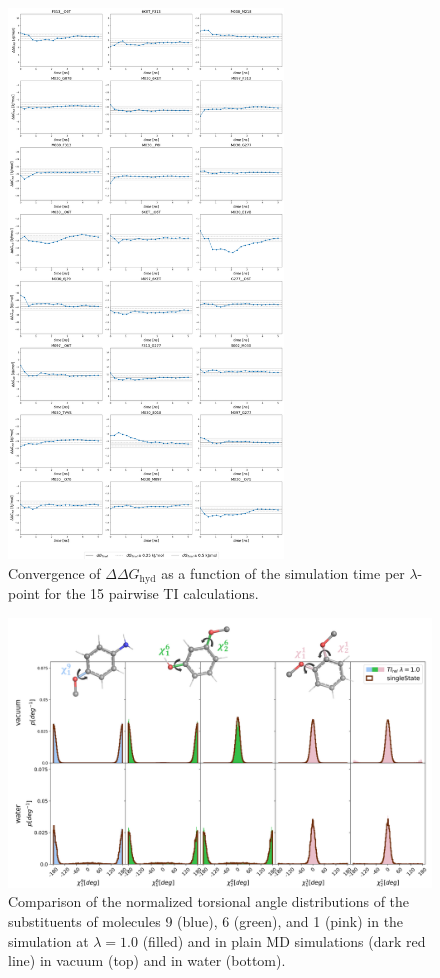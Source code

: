 \begin{figure}[H]
    \centering
    \includegraphics[width=0.65\textwidth]{fig/SI/dG_convergence/ddG_TI_convergence.png}
    \caption{Convergence of $\Delta \Delta G_\text{hyd}$ as a function of the simulation time per $\lambda$-point for the 15 pairwise TI calculations.}
    \label{fig: SI_figure df_convergence_TI}
\end{figure}


\begin{figure}[h]
    \centering
    \includegraphics[width=\textwidth]{fig/results/pairwise/sampling/torsions/TI_all_substorsion_ana_partnerM030_singleState_populations_total.png}
    \caption{Comparison of the normalized torsional angle distributions of the substituents of molecules 9 (blue), 6 (green), and 1 (pink) in the simulation at $\lambda=1.0$ (filled) and in plain MD simulations (dark red line) in vacuum (top) and in water (bottom).}
    \label{SIfig: TIsubsTorisions}
\end{figure}
